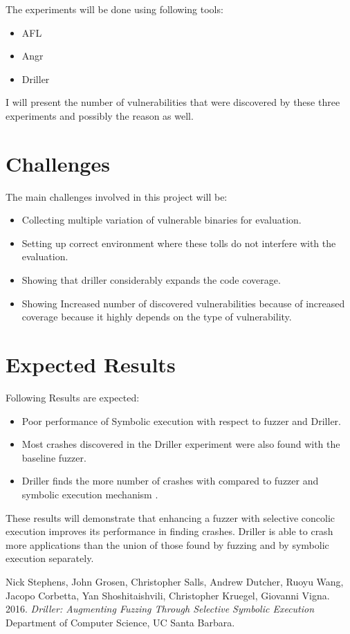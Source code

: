 \documentclass[a4paper, 11pt]{article}
\begin{document}
The experiments will be done using following tools:
\begin{itemize}
	\item AFL
	\item Angr
	\item Driller
\end{itemize}

I will present the number of vulnerabilities that were discovered by these three experiments and possibly the reason as well.

\section*{Challenges}
The main challenges involved in this project will be: 
\begin{itemize}
	\item Collecting multiple variation of vulnerable binaries for evaluation.
	\item Setting up correct environment where these tolls do not interfere with the evaluation.
	\item Showing that driller considerably expands the code coverage.
	\item Showing Increased number of discovered vulnerabilities because of increased coverage because it highly depends on the type of vulnerability.
\end{itemize}

\section*{Expected Results}
Following Results are expected:
\begin{itemize}
	\item Poor performance of Symbolic execution with respect to fuzzer and Driller.
	\item Most crashes discovered in the Driller experiment were also found with the baseline fuzzer.
	\item Driller finds the more number of crashes with compared to fuzzer and symbolic execution mechanism .
\end{itemize}

These results will demonstrate that enhancing a fuzzer with selective concolic execution improves its performance in finding crashes. Driller is able to crash more applications than the union of those found by fuzzing and by symbolic execution separately.

\begin{thebibliography}{9} 
Nick Stephens, John Grosen, Christopher Salls, Andrew Dutcher, Ruoyu Wang, Jacopo Corbetta, Yan Shoshitaishvili, Christopher Kruegel, Giovanni Vigna. 2016. \emph{Driller: Augmenting Fuzzing Through Selective Symbolic Execution}  Department of Computer Science, UC Santa Barbara. 
\end{thebibliography}
\end{document}
